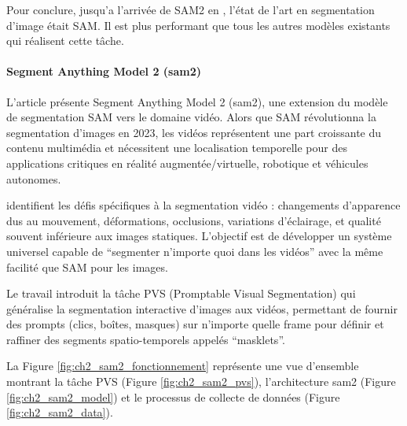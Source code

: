 Pour conclure, jusqu'a l'arrivée de SAM2 en \citeyear{ravi_sam_2024}, l’état de l’art en segmentation d’image était SAM. Il est plus performant que tous les autres modèles existants qui réalisent cette tâche.

\paragraph{Segment Anything Model 2 (\acrshort{sam2})}
L'article \cite{ravi_sam_2024} présente Segment Anything Model 2 (\acrshort{sam2}), une extension du modèle de segmentation SAM vers le domaine vidéo. Alors que SAM révolutionna la segmentation d'images en 2023, les vidéos représentent une part croissante du contenu multimédia et nécessitent une localisation temporelle pour des applications critiques en réalité augmentée/virtuelle, robotique et véhicules autonomes.

\citeauthor{ravi_sam_2024} identifient les défis spécifiques à la segmentation vidéo : changements d'apparence dus au mouvement, déformations, occlusions, variations d'éclairage, et qualité souvent inférieure aux images statiques. L'objectif est de développer un système universel capable de ``segmenter n'importe quoi dans les vidéos'' avec la même facilité que SAM pour les images.

Le travail introduit la tâche PVS (Promptable Visual Segmentation) qui généralise la segmentation interactive d'images aux vidéos, permettant de fournir des prompts (clics, boîtes, masques) sur n'importe quelle frame pour définir et raffiner des segments spatio-temporels appelés ``masklets''.

La Figure \ref{fig:ch2_sam2_fonctionnement} représente une vue d'ensemble montrant la tâche PVS (Figure \ref{fig:ch2_sam2_pvs}), l'architecture \acrshort{sam2} (Figure \ref{fig:ch2_sam2_model}) et le processus de collecte de données (Figure \ref{fig:ch2_sam2_data}).

